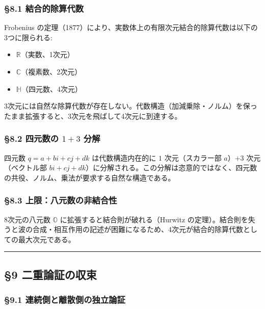 \documentclass[
  a4paper,11pt]{ltjsarticle}
\providecommand{\tightlist}{%
  \setlength{\itemsep}{0pt}\setlength{\parskip}{0pt}}
\theoremstyle{definition}
\theoremstyle{remark}
\begin{document}
\subsubsection{§8.1
結合的除算代数}\label{ux7d50ux5408ux7684ux9664ux7b97ux4ee3ux6570}

Frobenius
の定理（1877）により、実数体上の有限次元結合的除算代数は以下の3つに限られる:

\begin{itemize}
\tightlist
\item
  \(\mathbb{R}\)（実数、1次元）
\item
  \(\mathbb{C}\)（複素数、2次元）
\item
  \(\mathbb{H}\)（四元数、4次元）
\end{itemize}

3次元には自然な除算代数が存在しない。代数構造（加減乗除・ノルム）を保ったまま拡張すると、3次元を飛ばして4次元に到達する。

\subsubsection{\texorpdfstring{§8.2 四元数の \(1+3\)
分解}{§8.2 四元数の 1+3 分解}}\label{ux56dbux5143ux6570ux306e-13-ux5206ux89e3}

四元数 \(q = a + bi + cj + dk\) は代数構造内在的に \(1\)
次元（スカラー部 \(a\)）\(+ 3\) 次元（ベクトル部
\(bi + cj + dk\)）に分解される。この分解は恣意的ではなく、四元数の共役、ノルム、乗法が要求する自然な構造である。

\subsubsection{§8.3
上限：八元数の非結合性}\label{ux4e0aux9650ux516bux5143ux6570ux306eux975eux7d50ux5408ux6027}

8次元の八元数 \(\mathbb{O}\) に拡張すると結合則が破れる（Hurwitz
の定理）。結合則を失うと波の合成・相互作用の記述が困難になるため、4次元が結合的除算代数としての最大次元である。

\begin{center}\rule{0.5\linewidth}{0.5pt}\end{center}

\subsection{§9
二重論証の収束}\label{ux4e8cux91cdux8ad6ux8a3cux306eux53ceux675f}

\subsubsection{§9.1
連続側と離散側の独立論証}\label{ux9023ux7d9aux5074ux3068ux96e2ux6563ux5074ux306eux72ecux7acbux8ad6ux8a3c}
\end{document}
